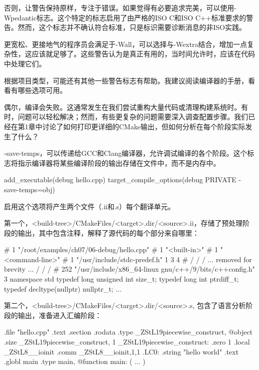 否则，让警告保持原样，专注于错误。如果觉得有必要追求完美，可以使用-Wpedantic标志。这个特定的标志启用了由严格的ISO C和ISO C++标准要求的警告。然而，这个标志并不确认符合标准，只是标识需要诊断消息的非ISO实践。

更宽松、更接地气的程序员会满足于-Wall，可以选择与-Wextra结合，增加一点复杂性，这应该就足够了。这些警告认为是真正有用的，当时间允许时，应该在代码中处理它们。

根据项目类型，可能还有其他一些警告标志有帮助。我建议阅读编译器的手册，看看有哪些选项可用。


偶尔，编译会失败。这通常发生在我们尝试重构大量代码或清理构建系统时。有时，问题可以轻松解决；然而，有些更复杂的问题需要深入调查配置步骤。我们已经在第1章中讨论了如何打印更详细的CMake输出，但如何分析在每个阶段实际发生了什么？


-save-temps，可以传递给GCC和Clang编译器，允许调试编译的各个阶段。这个标志将指示编译器将某些编译阶段的输出存储在文件中，而不是内存中。


\begin{cmake}
add_executable(debug hello.cpp)
target_compile_options(debug PRIVATE -save-temps=obj)
\end{cmake}

启用这个选项将产生两个文件（.ii和.s）每个翻译单元。

第一个，<build-tree>/CMakeFiles/<target>.dir/<source>.ii，存储了预处理阶段的输出，其中包含注释，解释了源代码的每个部分来自哪里：

\begin{shell}
# 1 "/root/examples/ch07/06-debug/hello.cpp"
# 1 "<built-in>"
# 1 "<command-line>"
# 1 "/usr/include/stdc-predef.h" 1 3 4
# / / / ... removed for brevity ... / / /
# 252 "/usr/include/x86_64-linux
  gnu/c++/9/bits/c++config.h" 3
namespace std
{
    typedef long unsigned int size_t;
    typedef long int ptrdiff_t;
    typedef decltype(nullptr) nullptr_t;
}
...
\end{shell}

第二个，<build-tree>/CMakeFiles/<target>.dir/<source>.s, 包含了语言分析阶段的输出，准备进入汇编阶段：

\begin{shell}
        .file "hello.cpp"
        .text
        .section .rodata
        .type _ZStL19piecewise_construct, @object
        .size _ZStL19piecewise_construct, 1
_ZStL19piecewise_construct:
        .zero 1
        .local _ZStL8__ioinit
        .comm _ZStL8__ioinit,1,1
.LC0:
        .string "hello world"
        .text
        .globl main
        .type main, @function
main:
( ... )
\end{shell}

